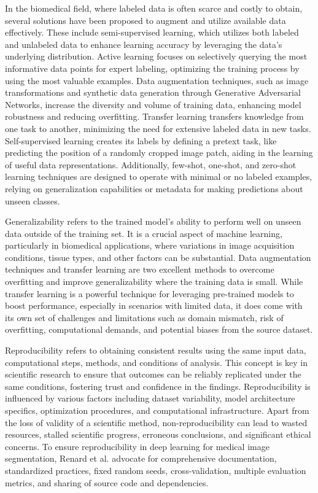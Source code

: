 \documentclass[./dissertation.tex]{subfiles}
\begin{document}
In the biomedical field, where labeled data is often scarce and costly to obtain, several solutions have been proposed to augment and utilize available data effectively. These include semi-supervised learning, which utilizes both labeled and unlabeled data to enhance learning accuracy by leveraging the data’s underlying distribution. Active learning focuses on selectively querying the most informative data points for expert labeling, optimizing the training process by using the most valuable examples. Data augmentation techniques, such as image transformations and synthetic data generation through Generative Adversarial Networks, increase the diversity and volume of training data, enhancing model robustness and reducing overfitting. Transfer learning transfers knowledge from one task to another, minimizing the need for extensive labeled data in new tasks. Self-supervised learning creates its labels by defining a pretext task, like predicting the position of a randomly cropped image patch, aiding in the learning of useful data representations. Additionally, few-shot, one-shot, and zero-shot learning techniques are designed to operate with minimal or no labeled examples, relying on generalization capabilities or metadata for making predictions about unseen classes.

Generalizability refers to the trained model’s ability to perform well on unseen data outside of the training set. It is a crucial aspect of machine learning, particularly in biomedical applications, where variations in image acquisition conditions, tissue types, and other factors can be substantial. Data augmentation techniques and transfer learning are two excellent methods to overcome overfitting and improve generalizability where the training data is small. While transfer learning is a powerful technique for leveraging pre-trained models to boost performance, especially in scenarios with limited data, it does come with its own set of challenges and limitations such as domain mismatch, risk of overfitting, computational demands, and potential biases from the source dataset.

Reproducibility refers to obtaining consistent results using the same input data, computational steps, methods, and conditions of analysis. This concept is key in scientific research to ensure that outcomes can be reliably replicated under the same conditions, fostering trust and confidence in the findings. Reproducibility is influenced by various factors including dataset variability, model architecture specifics, optimization procedures, and computational infrastructure. Apart from the loss of validity of a scientific method, non-reproducibility can lead to wasted resources, stalled scientific progress, erroneous conclusions, and significant ethical concerns. To ensure reproducibility in deep learning for medical image segmentation, Renard et al. advocate for comprehensive documentation, standardized practices, fixed random seeds, cross-validation, multiple evaluation metrics, and sharing of source code and dependencies.
\end{document}

